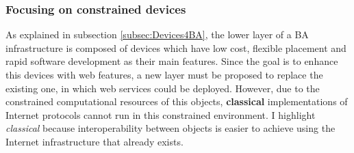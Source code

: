 





\subsubsection{Focusing on constrained devices}
As explained in subsection \ref{subsec:Devices4BA}, the lower layer of a BA infrastructure is composed of devices which have low cost, flexible placement and rapid software development as their main features.
Since the goal is to enhance this devices with web features, a new layer must be proposed to replace the existing one, in which web services could be deployed.
However, due to the constrained computational resources of this objects, \textbf{classical} implementations of Internet protocols cannot run in this constrained environment.
I highlight \textit{classical} because interoperability between objects is easier to achieve using the Internet infrastructure that already exists.

